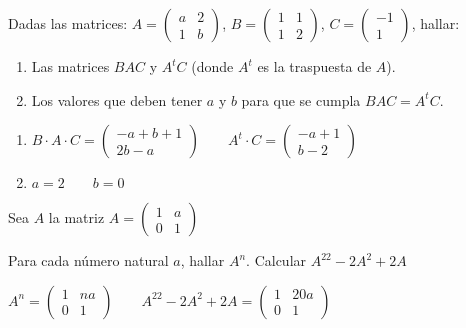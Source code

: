 \begin{ejer}
Dadas las matrices:
$A=\begin{pmatrix}
 a & 2 \\
 1 & b
\end{pmatrix} $, 
$B=\begin{pmatrix}
 1 & 1 \\
 1 & 2
\end{pmatrix} $, 
$C=\begin{pmatrix}
 -1 \\
 1 
\end{pmatrix} $, hallar:
\begin{enumerate}[label=\alph*)]
\item Las matrices $BAC$ y $A^tC$ (donde $A^t$ es la traspuesta de $A$).
\item Los valores que deben tener $a$ y $b$ para que se cumpla $BAC=A^tC$.
\end{enumerate}
\begin{solu}
\begin{enumerate}[label=\alph*)]
\item $B\cdot A \cdot C= \begin{pmatrix} -a+b+1 \\ 2b-a \end{pmatrix} \qquad A^t \cdot C= \begin{pmatrix} -a+1 \\ b-2 \end{pmatrix}$
\item $a=2 \qquad b=0$
\end{enumerate}
\end{solu}
\end{ejer}

\begin{ejer}
Sea $A$ la matriz $A=\begin{pmatrix}
1 & a \\
0 & 1
\end{pmatrix}$

Para cada número natural $a$, hallar $A^n$. Calcular $A^{22}-2A^2+2A$
\begin{solu}

$A^n= \begin{pmatrix}
1 & na \\
0 & 1
\end{pmatrix} \qquad A^{22}-2A^2+2A=\begin{pmatrix}
1 & 20a \\
0 & 1
\end{pmatrix}$
\end{solu}
\end{ejer}


